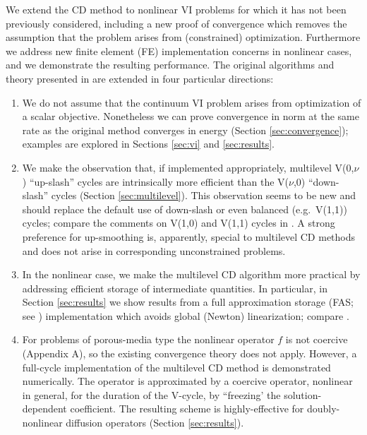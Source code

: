 \documentclass[letterpaper,final,12pt,reqno]{amsart}
\theoremstyle{cstyle}
\theoremstyle{cstyle*}
\theoremstyle{dstyle}
\numberwithin{equation}{section}
\numberwithin{figure}{section}
\numberwithin{table}{section}
\numberwithin{theorem}{section}
\begin{document}
We extend the CD method to nonlinear VI problems for which it has not been previously considered, including a new proof of convergence which removes the assumption that the problem arises from (constrained) optimization.  Furthermore we address new finite element (FE) implementation concerns in nonlinear cases, and we demonstrate the resulting performance.  The original algorithms and theory presented in \cite{Tai2003} are extended in four particular directions:
\renewcommand{\labelenumi}{\emph{(\roman{enumi})}}
\begin{enumerate}
\item We do not assume that the continuum VI problem arises from optimization of a scalar objective.  Nonetheless we can prove convergence in norm at the same rate as the original method converges in energy (Section \ref{sec:convergence}); %
examples are explored in Sections \ref{sec:vi} and \ref{sec:results}.

\item We make the observation that, if implemented appropriately, multilevel V(0,$\nu$) ``up-slash'' cycles are intrinsically more efficient than the V($\nu$,0) ``down-slash'' cycles (Section \ref{sec:multilevel}).  This observation seems to be new and should replace the default use of down-slash or even balanced (e.g.~V(1,1)) cycles; compare the comments on V(1,0) and V(1,1) cycles in \cite{GraeserKornhuber2009,Tai2003}.  A strong preference for up-smoothing is, apparently, special to multilevel CD methods and does not arise in corresponding unconstrained problems.

\item In the nonlinear case, we make the multilevel CD algorithm more practical by addressing efficient storage of intermediate quantities.  In particular, in Section \ref{sec:results} we show results from a full approximation storage (FAS; see \cite{Brandt1977}) implementation which avoids global (Newton) linearization; compare \cite{GraeserKornhuber2009}.

\item For problems of porous-media type the nonlinear operator $f$ is not coercive (Appendix A), so the existing convergence theory does not apply.  However, a full-cycle implementation of the multilevel CD method is demonstrated numerically.  The operator is approximated by a coercive operator, nonlinear in general, for the duration of the V-cycle, by ``freezing' the solution-dependent coefficient.  The resulting scheme is highly-effective for doubly-nonlinear diffusion operators (Section \ref{sec:results}).
\end{enumerate}
\end{document}
